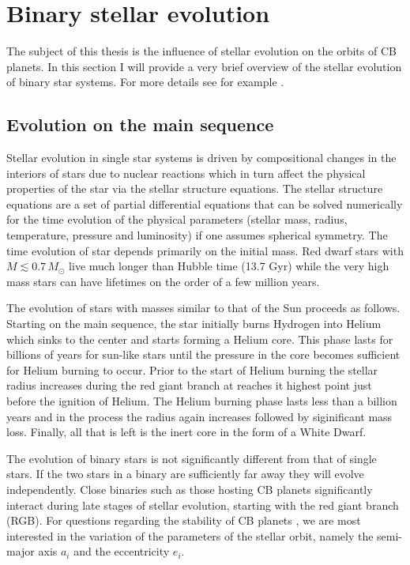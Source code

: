 \documentclass[ twoside,openright,titlepage,numbers=noenddot,headinclude,%
                footinclude=true,cleardoublepage=empty,abstractoff, %
                BCOR=5mm,paper=a4,fontsize=11pt,%
                american,%
                ]{scrreprt}
\begin{document}
\section{Binary stellar evolution}
\label{sec:stellar_evolution}
The subject of this thesis is the influence of stellar evolution on the orbits
of CB planets. In this section I will provide a very brief overview of the
stellar evolution of binary star systems. For more details see for example
\cite{prialnik2009}.
\subsection{Evolution on the main sequence}
\label{sub:Evolution on the main sequence}
Stellar evolution in single star systems
is driven by compositional changes in the interiors of stars due to nuclear 
reactions which in turn affect the physical properties of the star 
via the stellar structure equations. The stellar structure equations
\citep[see for ex.]{prialnik2009} are a set of partial differential equations
that can be solved numerically for the time evolution of the 
physical parameters 
(stellar mass, radius, temperature, pressure and luminosity) if one assumes 
spherical symmetry. The time evolution of star depends primarily on the 
initial mass. Red dwarf stars with $M\lesssim 0.7\,M_\odot$ live much longer
than Hubble time (13.7 Gyr) while the very high mass stars can have lifetimes
on the order of a few million years.

The evolution of stars with masses similar to that of the Sun proceeds as 
follows. Starting on the main sequence, the star initially burns
Hydrogen into Helium which sinks to the center and starts forming a Helium
core. This phase lasts for billions of years for sun-like stars until the 
pressure in the core becomes sufficient for Helium burning to occur. Prior
to the start of Helium burning the stellar radius increases during the red
giant branch at reaches it highest point just before the ignition of Helium.
The
Helium burning phase lasts less than a billion years and in the process the 
radius again increases followed by siginificant mass loss. Finally, all that is
left is 
the inert core in the form of a White Dwarf.


The evolution of binary stars is not significantly different from that of 
single stars. If the two stars in a binary are 
sufficiently far away they will evolve independently. 
Close binaries such as those hosting CB planets significantly 
interact during late stages of stellar evolution, starting with the 
red giant branch (RGB). For questions regarding the stability of CB planets
, we are most interested in the variation of the parameters of the stellar 
orbit, namely the semi-major axis $a_i$ and
the eccentricity $e_i$. 
\end{document}
